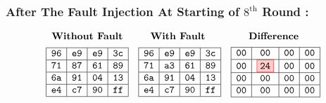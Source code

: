 \subsubsection{After The Fault Injection At Starting of $8^{\text{th}}$ Round :}
\[
\begin{array}{ccc}
\textbf{Without Fault} & \textbf{With Fault } & \textbf{Difference } \\[1ex]
\begin{array}{|c|c|c|c|}
\hline
\texttt{96} & \texttt{e9} & \texttt{e9} & \texttt{3c} \\
\hline
\texttt{71} & \texttt{87} & \texttt{61} & \texttt{89} \\
\hline
\texttt{6a} & \texttt{91} & \texttt{04} & \texttt{13} \\
\hline
\texttt{e4} & \texttt{c7} & \texttt{90} & \texttt{ff} \\
\hline
\end{array} 
&

\begin{array}{|c|c|c|c|}
    \hline
    \texttt{96} & \texttt{e9} & \texttt{e9} & \texttt{3c} \\
    \hline
    \texttt{71} & \texttt{a3} & \texttt{61} & \texttt{89} \\
    \hline
    \texttt{6a} & \texttt{91} & \texttt{04} & \texttt{13} \\
    \hline
    \texttt{e4} & \texttt{c7} & \texttt{90} & \texttt{ff} \\
    \hline
    \end{array}

    &

\begin{array}{|c|c|c|c|}
    \hline
    \texttt{00} & \texttt{00} & \texttt{00} &\texttt{00} \\
    \hline
    {\texttt{00}} & \fcolorbox{red}{red!20}{\texttt{24}} & \texttt{00} & \texttt{00} \\
    \hline
    \texttt{00} & \texttt{00} & \texttt{00} & \texttt{00} \\
    \hline
    \texttt{00} & \texttt{00} & \texttt{00} & \texttt{00} \\
    \hline
    \end{array}
\end{array}
\]

